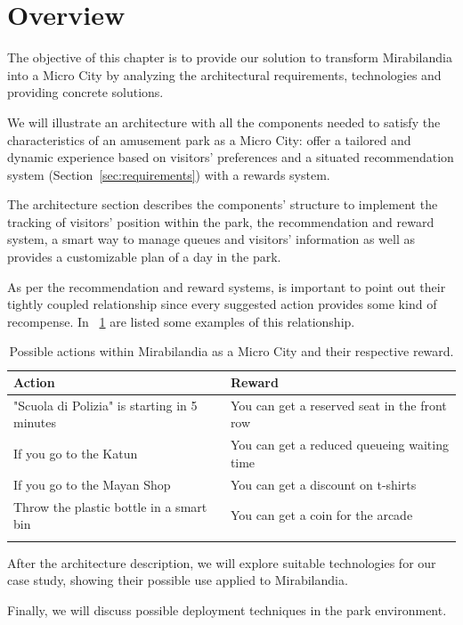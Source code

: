 \section{Overview}\label{sec:overview}
The objective of this chapter is to provide our solution to transform Mirabilandia into a Micro City by analyzing the architectural requirements, technologies and providing concrete solutions.

We will illustrate an architecture with all the components needed to satisfy the characteristics of an amusement park as a Micro City: offer a
tailored and dynamic experience based on visitors' preferences and a situated recommendation system (Section~\ref{sec:requirements}) with a rewards system.

The architecture section describes the components' structure to implement the tracking of visitors' position within the park, the recommendation and reward system, a smart way to manage queues and visitors' information as well as provides a customizable plan of a day in the park.

As per the recommendation and reward systems, is important to point out their tightly coupled relationship since every suggested action provides some
kind of recompense. In ~\ref{tab:actions-rewards} are listed some examples of this relationship.

\begin{longtable}{|l|l|}
	\hline
	\textbf{Action}                         & \textbf{Reward}                              \\
	\hline
	"Scuola di Polizia" is starting in 5 minutes      & You can get a reserved seat in the front row \\
	\hline
	If you go to the Katun        & You can get a reduced queueing waiting time  \\
	\hline
	If you go to the Mayan Shop                  & You can get a discount on t-shirts           \\
	\hline
	Throw the plastic bottle in a smart bin & You can get a coin for the arcade            \\
	\hline
	\caption{Possible actions within Mirabilandia as a Micro City and their respective reward.}
	\label{tab:actions-rewards}
\end{longtable}

After the architecture description, we will explore suitable technologies for our case study, showing their possible use applied to Mirabilandia.

Finally, we will discuss possible deployment techniques in the park environment.

